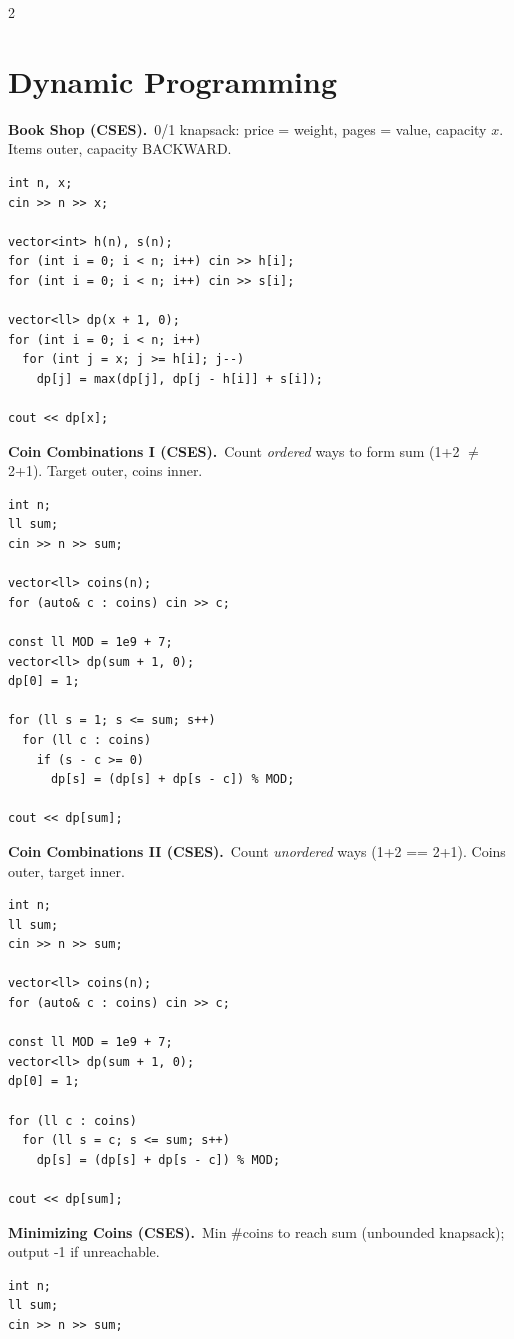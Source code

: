 \documentclass[10pt,letterpaper]{extarticle}
\newcommand{\prob}[2]{\par\addvspace{10pt}\noindent\label{prob:#1}\textbf{\normalsize #1.}\ {\small #2}\par\nopagebreak}
\begin{document}
\begin{multicols*}{2}
\section*{Dynamic Programming}

\prob{Book Shop (CSES)}{0/1 knapsack: price = weight, pages = value, capacity $x$. Items outer, capacity BACKWARD.}
\begin{lstlisting}[style=cppt]
int n, x;
cin >> n >> x;

vector<int> h(n), s(n);
for (int i = 0; i < n; i++) cin >> h[i];
for (int i = 0; i < n; i++) cin >> s[i];

vector<ll> dp(x + 1, 0);
for (int i = 0; i < n; i++)
  for (int j = x; j >= h[i]; j--)
    dp[j] = max(dp[j], dp[j - h[i]] + s[i]);

cout << dp[x];
\end{lstlisting}

\prob{Coin Combinations I (CSES)}{Count \emph{ordered} ways to form sum (1+2 $\ne$ 2+1). Target outer, coins inner.}
\begin{lstlisting}[style=cppt]
int n;
ll sum;
cin >> n >> sum;

vector<ll> coins(n);
for (auto& c : coins) cin >> c;

const ll MOD = 1e9 + 7;
vector<ll> dp(sum + 1, 0);
dp[0] = 1;

for (ll s = 1; s <= sum; s++)
  for (ll c : coins)
    if (s - c >= 0)
      dp[s] = (dp[s] + dp[s - c]) % MOD;

cout << dp[sum];
\end{lstlisting}

\prob{Coin Combinations II (CSES)}{Count \emph{unordered} ways (1+2 == 2+1). Coins outer, target inner.}
\begin{lstlisting}[style=cppt]
int n;
ll sum;
cin >> n >> sum;

vector<ll> coins(n);
for (auto& c : coins) cin >> c;

const ll MOD = 1e9 + 7;
vector<ll> dp(sum + 1, 0);
dp[0] = 1;

for (ll c : coins)
  for (ll s = c; s <= sum; s++)
    dp[s] = (dp[s] + dp[s - c]) % MOD;

cout << dp[sum];
\end{lstlisting}

\prob{Minimizing Coins (CSES)}{Min \#coins to reach sum (unbounded knapsack); output -1 if unreachable.}
\begin{lstlisting}[style=cppt]
int n;
ll sum;
cin >> n >> sum;


\end{lstlisting}
\end{multicols*}
\end{document}
